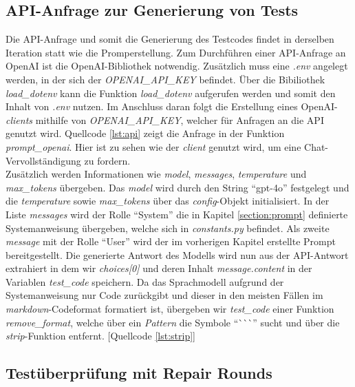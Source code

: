 \subsection{API-Anfrage zur Generierung von Tests}
Die API-Anfrage und somit die Generierung des Testcodes findet in derselben Iteration statt wie die Promperstellung. Zum Durchführen einer API-Anfrage an OpenAI ist die OpenAI-Bibliothek notwendig. Zusätzlich muss eine \textit{.env} angelegt werden, in der sich der \textit{OPENAI\_API\_KEY} befindet. Über die Bibiliothek \textit{load\_dotenv} kann die Funktion \textit{load\_dotenv} aufgerufen werden und somit den Inhalt von \textit{.env} nutzen. Im Anschluss daran folgt die Erstellung eines OpenAI-\textit{clients} mithilfe von \textit{OPENAI\_API\_KEY}, welcher für Anfragen an die API genutzt wird. Quellcode \ref{lst:api} zeigt die Anfrage in der Funktion \textit{prompt\_openai}. Hier ist zu sehen wie der \textit{client} genutzt wird, um eine Chat-Vervollständigung zu fordern. \\
\vspace{-.3cm}
Zusätzlich werden Informationen wie \textit{model}, \textit{messages}, \textit{temperature} und \textit{max\_tokens} übergeben. Das \textit{model} wird durch den String ``gpt-4o'' festgelegt und die \textit{temperature} sowie \textit{max\_tokens} über das \textit{config}-Objekt initialisiert. In der Liste \textit{messages} wird der Rolle ``System'' die in Kapitel \ref{section:prompt} definierte Systemanweisung übergeben, welche sich in \textit{constants.py} befindet. Als zweite \textit{message} mit der Rolle ``User'' wird der im vorherigen Kapitel erstellte Prompt bereitgestellt. Die generierte Antwort des Modells wird nun aus der API-Antwort extrahiert in dem wir \textit{choices[0]} und deren Inhalt \textit{message.content} in der Variablen \textit{test\_code} speichern. Da das Sprachmodell aufgrund der Systemanweisung nur Code zurückgibt und dieser in den meisten Fällen im \textit{markdown}-Codeformat formatiert ist, übergeben wir \textit{test\_code} einer Funktion \textit{remove\_format}, welche über ein \textit{Pattern} die Symbole ``\`{}\`{}\`{}'' sucht und über die \textit{strip}-Funktion entfernt. [Quellcode \ref{lst:strip}]\\
\vspace{-.3cm}

\subsection{Testüberprüfung mit Repair Rounds}